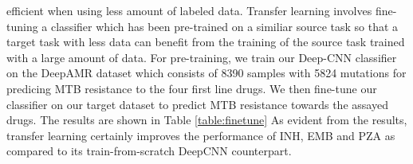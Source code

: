 \documentclass{article}
\begin{document}
efficient when using less amount of labeled data. Transfer learning involves fine-tuning a classifier
which has been pre-trained on a similiar source task so that a target task with less data can benefit
from the training of the source task trained with a large amount of data. For pre-training, we train our
Deep-CNN classifier on the DeepAMR \cite{10.1093/bioinformatics/btz067} dataset which consists of 
8390 samples with 5824 mutations for
predicing MTB resistance to the four first line drugs. We then fine-tune our classifier on our target
dataset to predict MTB resistance towards the assayed drugs. The results are shown in Table \ref{table:finetune}
As evident from the results, transfer learning certainly improves the performance of INH, EMB and PZA as
compared to its train-from-scratch DeepCNN counterpart.
\end{document}
